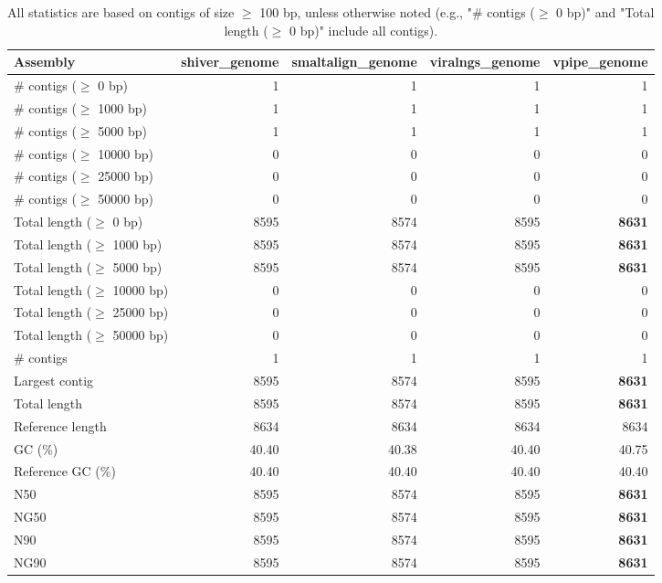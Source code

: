 \documentclass[12pt,a4paper]{article}
\begin{document}
\begin{table}[ht]
\begin{center}
\caption{All statistics are based on contigs of size $\geq$ 100 bp, unless otherwise noted (e.g., "\# contigs ($\geq$ 0 bp)" and "Total length ($\geq$ 0 bp)" include all contigs).}
\begin{tabular}{|l*{4}{|r}|}
\hline
Assembly & shiver\_genome & smaltalign\_genome & viralngs\_genome & vpipe\_genome \\ \hline
\# contigs ($\geq$ 0 bp) & 1 & 1 & 1 & 1 \\ \hline
\# contigs ($\geq$ 1000 bp) & 1 & 1 & 1 & 1 \\ \hline
\# contigs ($\geq$ 5000 bp) & 1 & 1 & 1 & 1 \\ \hline
\# contigs ($\geq$ 10000 bp) & 0 & 0 & 0 & 0 \\ \hline
\# contigs ($\geq$ 25000 bp) & 0 & 0 & 0 & 0 \\ \hline
\# contigs ($\geq$ 50000 bp) & 0 & 0 & 0 & 0 \\ \hline
Total length ($\geq$ 0 bp) & 8595 & 8574 & 8595 & {\bf 8631} \\ \hline
Total length ($\geq$ 1000 bp) & 8595 & 8574 & 8595 & {\bf 8631} \\ \hline
Total length ($\geq$ 5000 bp) & 8595 & 8574 & 8595 & {\bf 8631} \\ \hline
Total length ($\geq$ 10000 bp) & 0 & 0 & 0 & 0 \\ \hline
Total length ($\geq$ 25000 bp) & 0 & 0 & 0 & 0 \\ \hline
Total length ($\geq$ 50000 bp) & 0 & 0 & 0 & 0 \\ \hline
\# contigs & 1 & 1 & 1 & 1 \\ \hline
Largest contig & 8595 & 8574 & 8595 & {\bf 8631} \\ \hline
Total length & 8595 & 8574 & 8595 & {\bf 8631} \\ \hline
Reference length & 8634 & 8634 & 8634 & 8634 \\ \hline
GC (\%) & 40.40 & 40.38 & 40.40 & 40.75 \\ \hline
Reference GC (\%) & 40.40 & 40.40 & 40.40 & 40.40 \\ \hline
N50 & 8595 & 8574 & 8595 & {\bf 8631} \\ \hline
NG50 & 8595 & 8574 & 8595 & {\bf 8631} \\ \hline
N90 & 8595 & 8574 & 8595 & {\bf 8631} \\ \hline
NG90 & 8595 & 8574 & 8595 & {\bf 8631} \\ \hline

\end{tabular}
\end{center}
\end{table}
\end{document}
